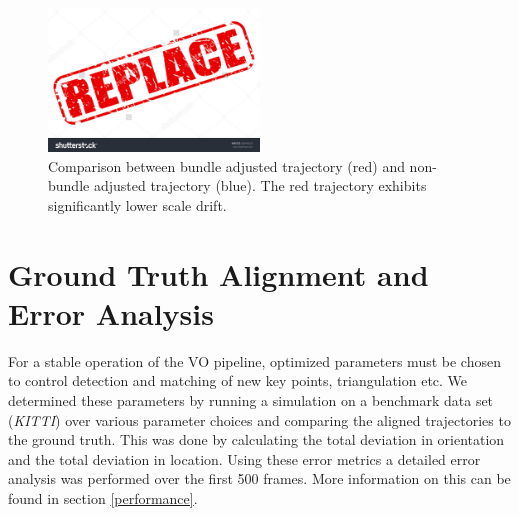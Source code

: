 \begin{figure}[htp]
  \centering
    \includegraphics[width=0.5\textwidth]{figures/BAeffect}
  \caption{Comparison between bundle adjusted trajectory (red) and non-bundle adjusted trajectory (blue). The red trajectory exhibits significantly lower scale drift.}
  \label{fig:BAeffect}
\end{figure}

\section{Ground Truth Alignment and Error Analysis}
\label{simulation}

For a stable operation of the VO pipeline, optimized parameters must be chosen to control detection and matching of new key points, triangulation etc. 
We determined these parameters by running a simulation  on a benchmark data set (\emph{KITTI}) over various parameter choices and comparing the aligned  trajectories to the ground truth. This was done by calculating the total deviation in orientation and the total deviation in location.
Using these error metrics a detailed error analysis was performed over the first 500 frames. 
More information on this can be found in section \ref{performance}.